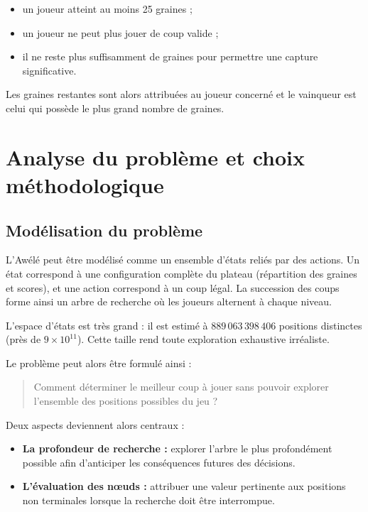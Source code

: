 \documentclass[11pt,a4paper]{article}
\begin{document}
\begin{itemize}
  \item un joueur atteint au moins 25 graines ;
  \item un joueur ne peut plus jouer de coup valide ;
  \item il ne reste plus suffisamment de graines pour permettre une capture significative.
\end{itemize}

Les graines restantes sont alors attribuées au joueur concerné et le vainqueur est celui qui possède le plus grand nombre de
graines.


\section{Analyse du problème et choix méthodologique}

\subsection{Modélisation du problème}

L'Awélé peut être modélisé comme un ensemble d'états reliés par des actions.
Un état correspond à une configuration complète du plateau (répartition des graines et scores), et une action correspond à un
coup légal. La succession des coups forme ainsi un arbre de recherche où les joueurs alternent à chaque niveau.

L'espace d'états est très grand : il est estimé à $889\,063\,398\,406$ positions distinctes (près de $9 \times 10^{11}$). Cette
taille rend toute exploration exhaustive irréaliste.

Le problème peut alors être formulé ainsi :

\begin{quote}
Comment déterminer le meilleur coup à jouer sans pouvoir explorer l'ensemble des positions possibles du jeu ?
\end{quote}

Deux aspects deviennent alors centraux :

\begin{itemize}
  \item \textbf{La profondeur de recherche :} explorer l'arbre le plus profondément possible afin d'anticiper les conséquences futures des décisions.
  \item \textbf{L'évaluation des nœuds :} attribuer une valeur pertinente aux positions non terminales lorsque la recherche doit être interrompue.
\end{itemize}
\end{document}
